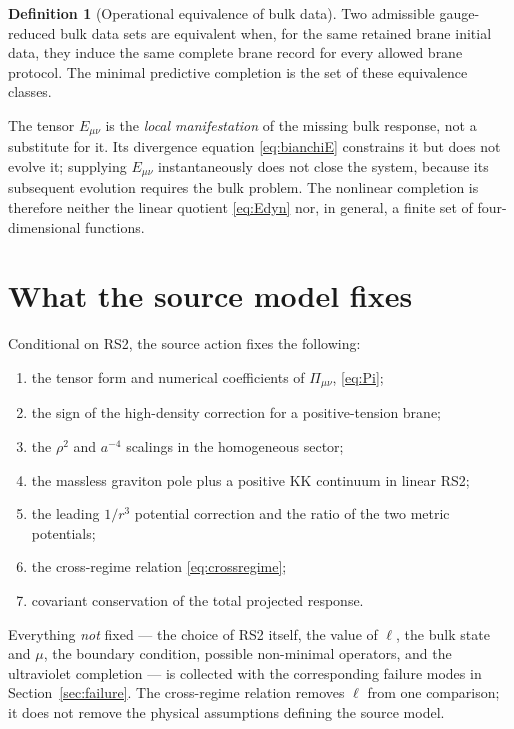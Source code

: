 \documentclass[11pt,a4paper]{article}
\theoremstyle{plain}
\theoremstyle{definition}
\newtheorem{definition}[theorem]{Definition}
\begin{document}
\begin{definition}[Operational equivalence of bulk data]
\label{def:nonlinearEquiv}
Two admissible gauge-reduced bulk data sets are equivalent when, for the
same retained brane initial data, they induce the same complete brane
record for every allowed brane protocol. The minimal predictive
completion is the set of these equivalence classes.
\end{definition}

The tensor $E_{\mu\nu}$ is the \emph{local manifestation} of the missing
bulk response, not a substitute for it. Its divergence equation
\eqref{eq:bianchiE} constrains it but does not evolve it; supplying
$E_{\mu\nu}$ instantaneously does not close the system, because its
subsequent evolution requires the bulk problem. The nonlinear completion
is therefore neither the linear quotient \eqref{eq:Edyn} nor, in general,
a finite set of four-dimensional functions.

\section{What the source model fixes}
\label{sec:fixed}

Conditional on RS2, the source action fixes the following:
\begin{enumerate}[leftmargin=*]
\item the tensor form and numerical coefficients of $\Pi_{\mu\nu}$,
\eqref{eq:Pi};
\item the sign of the high-density correction for a positive-tension
brane;
\item the $\rho^2$ and $a^{-4}$ scalings in the homogeneous sector;
\item the massless graviton pole plus a positive KK continuum in linear
RS2;
\item the leading $1/r^3$ potential correction and the ratio of the two
metric potentials;
\item the cross-regime relation \eqref{eq:crossregime};
\item covariant conservation of the total projected response.
\end{enumerate}

Everything \emph{not} fixed --- the choice of RS2 itself, the value of
$\ell$, the bulk state and $\mu$, the boundary condition, possible
non-minimal operators, and the ultraviolet completion --- is collected
with the corresponding failure modes in Section~\ref{sec:failure}. The
cross-regime relation removes $\ell$ from one comparison; it does not
remove the physical assumptions defining the source model.
\end{document}
